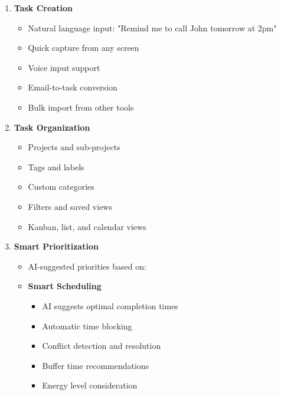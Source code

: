 \begin{enumerate}
    \item \textbf{Task Creation}
    \begin{itemize}
        \item Natural language input: "Remind me to call John tomorrow at 2pm"
        \item Quick capture from any screen
        \item Voice input support
        \item Email-to-task conversion
        \item Bulk import from other tools
    \end{itemize}
    
    \item \textbf{Task Organization}
    \begin{itemize}
        \item Projects and sub-projects
        \item Tags and labels
        \item Custom categories
        \item Filters and saved views
        \item Kanban, list, and calendar views
    \end{itemize}
    
    \item \textbf{Smart Prioritization}
    \begin{itemize}
        \item AI-suggested priorities based on:
    
    \item \textbf{Smart Scheduling}
    \begin{itemize}
        \item AI suggests optimal completion times
        \item Automatic time blocking
        \item Conflict detection and resolution
        \item Buffer time recommendations
        \item Energy level consideration
    \end{itemize}
    

\end{itemize}
\end{enumerate}
